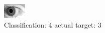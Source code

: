 \begin{figure}[h!]
\begin{center}
\includegraphics[width=0.60\columnwidth]{figures/ID292_class_4_target_3.png}
\end{center}
\caption{ Classification: 4 actual target: 3}
\label{fig:ID292_class_4_target_3}
\end{figure}
